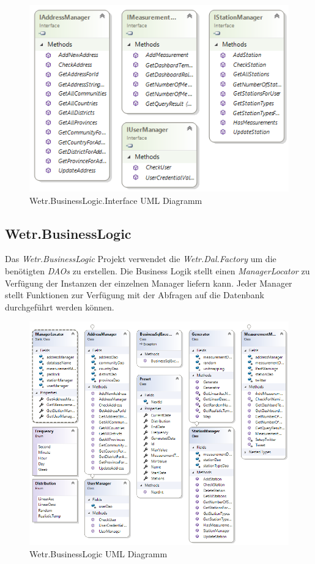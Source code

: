 \begin{figure}[H]
\centering
\includegraphics[width=\textwidth]{pictures/BusinessLogic_Interface.png}
\caption{Wetr.BusinessLogic.Interface UML Diagramm}
\label{fig:Wetr.BusinessLogic}
\end{figure}
\raggedright

\newpage
\subsection{Wetr.BusinessLogic}
Das \textit{Wetr.BusinessLogic} Projekt verwendet die \textit{Wetr.Dal.Factory} um die benötigten \textit{DAOs} zu erstellen. Die Business Logik stellt einen \textit{ManagerLocator} zu Verfügung der Instanzen der einzelnen Manager liefern kann. Jeder Manager stellt Funktionen zur Verfügung mit der Abfragen auf die Datenbank durchgeführt werden können.

\begin{figure}[H]
\centering
\includegraphics[width=\textwidth]{pictures/BusinessLogic.png}
\caption{Wetr.BusinessLogic UML Diagramm}
\label{fig:Wetr.BusinessLogic}
\end{figure}
\raggedright

